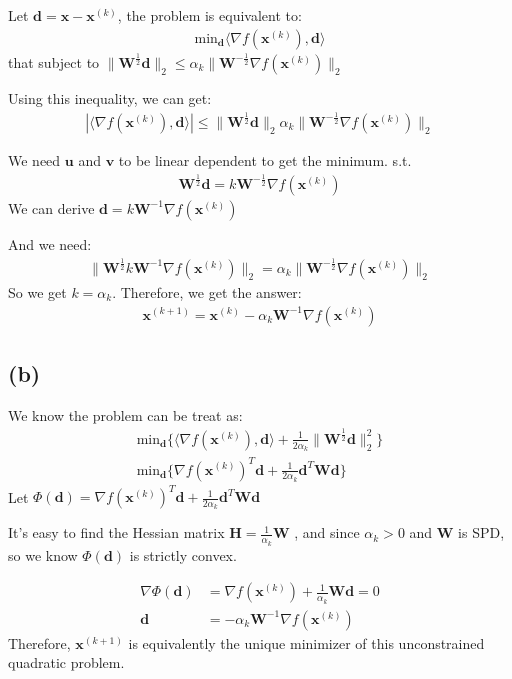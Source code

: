 \documentclass{article}
\begin{document}
Let \(\bm{d} = \bm{x} - \bm{x}^{(k)}\), the problem is equivalent to:
\begin{align*}
    \text{min}_{\bm{d}} \langle \nabla f(\bm{x}^{(k)}), \bm{d} \rangle
\end{align*}
that subject to \(\|\bm{W}^{\frac{1}{2} }\bm{d}\|_2 \leq \alpha_k\|\bm{W}^{-\frac{1}{2}} \nabla f(\bm{x}^{(k)})\|_2\)

Using this inequality, we can get:
\begin{align*}
    |\langle \nabla f(\bm{x}^{(k)}), \bm{d}\rangle| \leq \|\bm{W}^{\frac{1}{2} }\bm{d}\|_2 \alpha_k\|\bm{W}^{-\frac{1}{2}} \nabla f(\bm{x}^{(k)})\|_2
\end{align*}

We need \(\bm{u}\) and \(\bm{v}\) to be linear dependent to get the minimum. s.t.
\begin{align*}
    \bm{W}^{\frac{1}{2} }\bm{d}  = k \bm{W}^{-\frac{1}{2}} \nabla f(\bm{x}^{(k)})
\end{align*}
We can derive \(\bm{d} = k \bm{W}^{-1} \nabla f(\bm{x}^{(k)})\)

And we need:
\begin{align*}
    \|\bm{W}^{\frac{1}{2}}k \bm{W}^{-1} \nabla f(\bm{x}^{(k)})\|_2 = \alpha_k\|\bm{W}^{-\frac{1}{2}} \nabla f(\bm{x}^{(k)})\|_2
\end{align*}
So we get \(k = \alpha_k\). Therefore, we get the answer:
\begin{align*}
    \bm{x}^{(k + 1)} = \bm{x}^{(k)} - \alpha_k \bm{W}^{-1} \nabla f(\bm{x}^{(k)})
\end{align*}


\subsection*{(b)}
We know the problem can be treat as:
\begin{align*}
    \text{min}_{\bm{d}} \{\langle \nabla f(\bm{x}^{(k)}), \bm{d}\rangle + \frac{1}{2\alpha_k} \|\bm{W}^{\frac{1}{2}}\bm{d}\|_2^2\} \\
    \text{min}_{\bm{d}} \{\nabla f(\bm{x}^{(k)})^T\bm{d} + \frac{1}{2\alpha_k} \bm{d}^T\bm{W}\bm{d}\}
\end{align*}
Let \(\Phi(\bm{d}) = \nabla f(\bm{x}^{(k)})^T\bm{d} + \frac{1}{2\alpha_k} \bm{d}^T\bm{W}\bm{d}\)

It's easy to find the Hessian matrix \(\bm{H} = \frac{1}{\alpha_k} \bm{W}\)
, and since \(\alpha_k > 0\) and \(\bm{W}\) is SPD, so we know \(\Phi(\bm{d})\) is strictly convex.

\begin{align*}
    \nabla \Phi(\bm{d}) &= \nabla f(\bm{x}^{(k)}) + \frac{1}{\alpha_k} \bm{W}\bm{d} = 0\\
    \bm{d} &= -\alpha_k \bm{W}^{-1} \nabla f(\bm{x}^{(k)}) 
\end{align*}
Therefore, \(\bm{x}^{(k + 1)}\) is equivalently the unique minimizer of this unconstrained quadratic problem.
\end{document}

